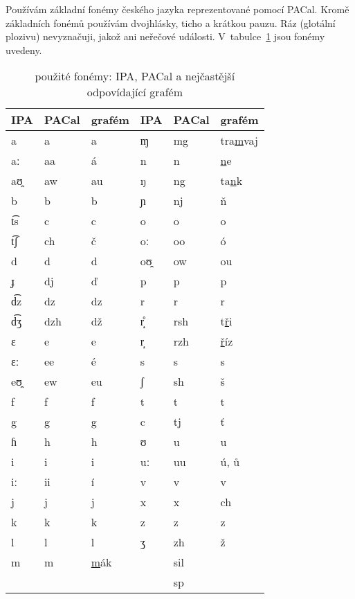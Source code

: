 
Používám základní fonémy českého jazyka\cite{palkova1992fonetika}
reprezentované pomocí PACal\cite{nouza1997phonetic}. Kromě základních fonémů
používám dvojhlásky, ticho a krátkou pauzu. Ráz (glotální plozivu) nevyznačuji,
jakož ani neřečové události.
V~tabulce~\ref{tab:phones} jsou fonémy uvedeny.

\begin{table}[htpb]
\begin{center}
\begin{tabular}{|l|l|l||l|l|l|}
\hline
IPA & PACal & grafém & IPA & PACal & grafém \\
\hline
a  & a   & a      &     ɱ  & mg  & tra\underline{m}vaj \\
aː & aa  & á      &     n  & n   & \underline{n}e \\
aʊ̯ & aw  & au     &     ŋ  & ng  & ta\underline{n}k \\
b  & b   & b      &     ɲ  & nj  & \v{n} \\
t͡s & c   & c      &     o  & o   & o \\
t͡ʃ & ch  & č      &     oː & oo  & ó \\
d  & d   & d      &     oʊ̯ & ow  & ou \\
ɟ  & dj  & \v{d}  &     p  & p   & p \\
d͡z & dz  & dz     &     r  & r   & r \\
d͡ʒ & dzh & dž     &     r̝̊  & rsh & t\underline{\v{r}}i \\
ɛ  & e   & e      &     r̝  & rzh & \underline{\v{r}}íz \\
ɛː & ee  & é      &     s  & s   & s \\
eʊ̯ & ew  & eu     &     ʃ  & sh  & š \\
f  & f   & f      &     t  & t   & t \\
g  & g   & g      &     c  & tj  & \v{t} \\
ɦ  & h   & h      &     ʊ  & u   & u \\
i  & i   & i      &     uː & uu  & ú, \r{u} \\
iː & ii  & í      &     v  & v   & v \\
j  & j   & j      &     x  & x   & ch \\
k  & k   & k      &     z  & z   & z \\
l  & l   & l      &     ʒ  & zh  & ž \\
m  & m   & \underline{m}ák
                  &        & sil & \\
   &     &        &        & sp  & \\
\hline
\end{tabular}
\caption{použité fonémy: IPA, PACal a nejčastější odpovídající
grafém}\label{tab:phones}
\end{center}
\end{table}
\normalfont


